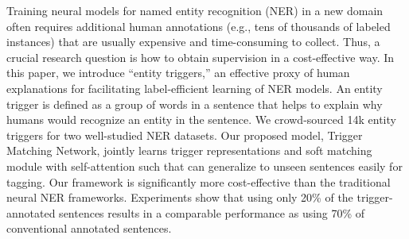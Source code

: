 Training neural models for named entity recognition (NER) in a new domain often requires additional human annotations (e.g., tens of thousands of labeled instances) that are usually expensive and time-consuming to collect. Thus, a crucial research question is how to obtain supervision in a cost-effective way. In this paper, we introduce ``entity triggers,'' an effective proxy of human explanations for facilitating label-efficient learning of NER models. An entity trigger is defined as a group of words in a sentence that helps to explain why humans would recognize an entity in the sentence. We crowd-sourced 14k entity triggers for two well-studied NER datasets. Our proposed model, Trigger Matching Network, jointly learns trigger representations and soft matching module with self-attention such that can generalize to unseen sentences easily for tagging. Our framework is significantly more cost-effective than the traditional neural NER frameworks. Experiments show that using only 20\% of the trigger-annotated sentences results in a comparable performance as using 70\% of conventional annotated sentences.
